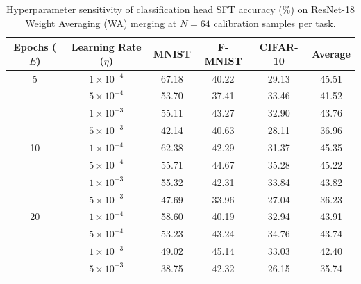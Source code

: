 \documentclass{article}
\theoremstyle{plain}
\theoremstyle{definition}
\theoremstyle{remark}
\begin{document}
\begin{table}[H]
\caption{Hyperparameter sensitivity of classification head SFT accuracy (\%) on ResNet-18 Weight Averaging (WA) merging at $N=64$ calibration samples per task.}
\label{tab:sft_sensitivity}
\vskip 0.1in
\centering
\begin{footnotesize}
\begin{tabular}{cccccc}
\toprule
Epochs ($E$) & Learning Rate ($\eta$) & MNIST & F-MNIST & CIFAR-10 & Average \\
\midrule
5 & $1 \times 10^{-4}$ & 67.18 & 40.22 & 29.13 & 45.51 \\
  & $5 \times 10^{-4}$ & 53.70 & 37.41 & 33.46 & 41.52 \\
  & $1 \times 10^{-3}$ & 55.11 & 43.27 & 32.90 & 43.76 \\
  & $5 \times 10^{-3}$ & 42.14 & 40.63 & 28.11 & 36.96 \\
\midrule
10 & $1 \times 10^{-4}$ & 62.38 & 42.29 & 31.37 & 45.35 \\
   & $5 \times 10^{-4}$ & 55.71 & 44.67 & 35.28 & 45.22 \\
   & $1 \times 10^{-3}$ & 55.32 & 42.31 & 33.84 & 43.82 \\
   & $5 \times 10^{-3}$ & 47.69 & 33.96 & 27.04 & 36.23 \\
\midrule
20 & $1 \times 10^{-4}$ & 58.60 & 40.19 & 32.94 & 43.91 \\
   & $5 \times 10^{-4}$ & 53.23 & 43.24 & 34.76 & 43.74 \\
   & $1 \times 10^{-3}$ & 49.02 & 45.14 & 33.03 & 42.40 \\
   & $5 \times 10^{-3}$ & 38.75 & 42.32 & 26.15 & 35.74 \\
\bottomrule
\end{tabular}
\end{footnotesize}
\vskip -0.1in
\end{table}
\end{document}
